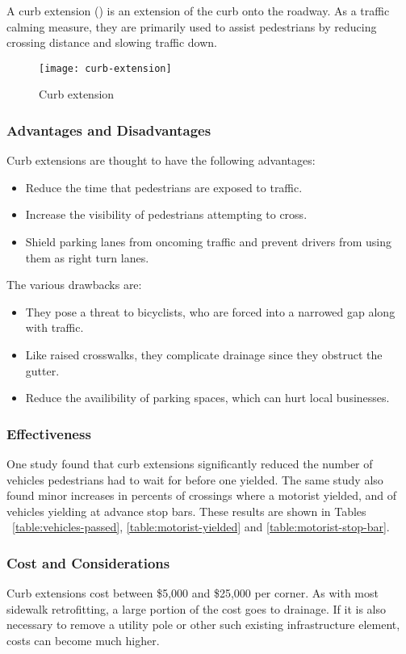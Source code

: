 A curb extension () is an extension of the curb onto the roadway. As a traffic calming measure, they are primarily used to assist pedestrians by reducing crossing distance and slowing traffic down.

\begin{figure}[h]
\centering
\texttt{[image: curb-extension]}
\caption{Curb extension}\label{fig:curb-extension}
\end{figure}

\subsubsection{Advantages and Disadvantages}

Curb extensions are thought to have the following advantages:\begin{itemize}
\item Reduce the time that pedestrians are exposed to traffic.
\item Increase the visibility of pedestrians attempting to cross.
\item Shield parking lanes from oncoming traffic and prevent drivers from using them as right turn lanes.
\end{itemize}

The various drawbacks are:\begin{itemize}
\item They pose a threat to bicyclists, who are forced into a narrowed gap along with traffic.
\item Like raised crosswalks, they complicate drainage since they obstruct the gutter.
\item Reduce the availibility of parking spaces, which can hurt local businesses.
\end{itemize}

\subsubsection{Effectiveness}

One study \cite{randal05} found that curb extensions significantly reduced the number of vehicles pedestrians had to wait for before one yielded. The same study also found minor increases in percents of crossings where a motorist yielded, and of vehicles yielding at advance stop bars. These results are shown in Tables ~\ref{table:vehicles-passed}, \ref{table:motorist-yielded} and \ref{table:motorist-stop-bar}.





\subsubsection{Cost and Considerations}

Curb extensions cost between \$5,000 and \$25,000 per corner\cite{walking-info-enhancements}. As with most sidewalk retrofitting, a large portion of the cost goes to drainage. If it is also necessary to remove a utility pole or other such existing infrastructure element, costs can become much higher.